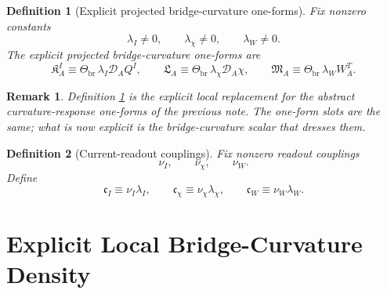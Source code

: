\documentclass[11pt]{article}
\newcommand{\SpatialD}{\mathcal D}
\newcommand{\CurvSeed}{\Theta_{\mathrm{br}}}
\newcommand{\CurvOneI}{\mathfrak K}
\newcommand{\CurvOneChi}{\mathfrak L}
\newcommand{\CurvOneW}{\mathfrak M}
\newtheorem{definition}{Definition}
\newtheorem{remark}{Remark}
\begin{document}
\begin{definition}[Explicit projected bridge-curvature one-forms]
\label{def:curvoneforms}
Fix nonzero constants
\begin{equation}
\lambda_I\neq 0,
\qquad
\lambda_\chi\neq 0,
\qquad
\lambda_W\neq 0.
\label{eq:lambdas}
\end{equation}
The explicit projected bridge-curvature one-forms are
\begin{equation}
\CurvOneI_A^I\equiv \CurvSeed\,\lambda_I\SpatialD_AQ^I,
\qquad
\CurvOneChi_A\equiv \CurvSeed\,\lambda_\chi\SpatialD_A\chi,
\qquad
\CurvOneW_A\equiv \CurvSeed\,\lambda_WW_A^T.
\label{eq:curvoneforms}
\end{equation}
\end{definition}

\begin{remark}
Definition \ref{def:curvoneforms} is the explicit local replacement for the abstract curvature-response one-forms of the previous note. The one-form slots are the same; what is now explicit is the bridge-curvature scalar that dresses them.
\end{remark}

\begin{definition}[Current-readout couplings]
\label{def:coeffs}
Fix nonzero readout couplings
\begin{equation}
\nu_I,
\qquad
\nu_\chi,
\qquad
\nu_W.
\label{eq:nus}
\end{equation}
Define
\begin{equation}
\mathfrak c_I\equiv \nu_I\lambda_I,
\qquad
\mathfrak c_\chi\equiv \nu_\chi\lambda_\chi,
\qquad
\mathfrak c_W\equiv \nu_W\lambda_W.
\label{eq:cdefs}
\end{equation}
\end{definition}

\section{Explicit Local Bridge-Curvature Density}
\end{document}
